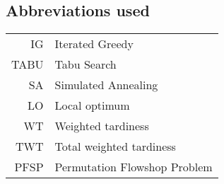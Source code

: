 \subsection{Abbreviations used}

\begin{tabular}{rl}
IG & Iterated Greedy\\
TABU & Tabu Search\\
SA & Simulated Annealing\\
LO & Local optimum\\
WT & Weighted tardiness\\
TWT & Total weighted tardiness\\
PFSP & Permutation Flowshop Problem\\
\end{tabular}